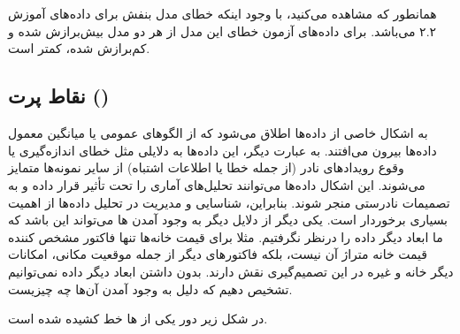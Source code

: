 \documentclass[a4paper, titlepage]{article}
\begin{document}
    \begin{center}
         \\
         \\
    \end{center}

\color{black}

همانطور که مشاهده می‌کنید، با وجود اینکه خطای مدل بنفش برای داده‌های آموزش ۲.۲ می‌باشد. برای داده‌های آزمون خطای این مدل از هر دو مدل بیش‌برازش شده و کم‌برازش شده، کمتر است.

\subsection{نقاط پرت ()}
به اشکال خاصی از داده‌ها اطلاق می‌شود که از الگوهای عمومی یا میانگین معمول داده‌ها بیرون می‌افتند. به عبارت دیگر، این داده‌ها به دلایلی مثل خطای اندازه‌گیری یا وقوع رویدادهای نادر (از جمله خطا یا اطلاعات اشتباه) از سایر نمونه‌ها متمایز می‌شوند. این اشکال داده‌ها می‌توانند تحلیل‌های آماری را تحت تأثیر قرار داده و به تصمیمات نادرستی منجر شوند. بنابراین، شناسایی و مدیریت  در تحلیل داده‌ها از اهمیت بسیاری برخوردار است.
یکی دیگر از دلایل دیگر به وجود آمدن ها می‌تواند این باشد که ما ابعاد دیگر داده را درنظر نگرفتیم. مثلا برای قیمت خانه‌ها تنها فاکتور مشخص کننده قیمت خانه متراژ آن نیست، بلکه فاکتور‌های دیگر از جمله موقعیت مکانی، امکانات دیگر خانه و غیره در این تصمیم‌گیری نقش دارند. بدون داشتن ابعاد دیگر داده نمی‌توانیم تشخیص دهیم که دلیل به وجود آمدن آن‌ها چه چیزیست.

در شکل زیر دور یکی از ها خط کشیده شده است.
\end{document}
